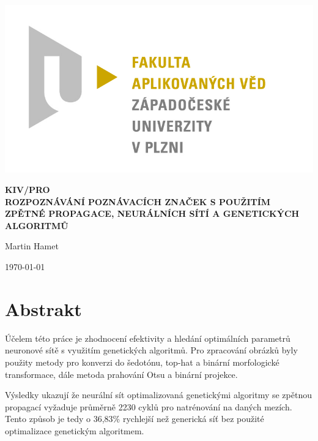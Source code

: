 \documentclass[12pt]{article}
\begin{document}
\begin{titlepage}
\includegraphics[scale=0.2, trim=5cm 0 0 30cm]{logo.jpg}
\begin{center}
\vspace{5cm}
{\Huge
\textbf{KIV/PRO}\\
\vspace{1cm}
}
{\Large
\textbf{ROZPOZNÁVÁNÍ POZNÁVACÍCH ZNAČEK S POUŽITÍM ZPĚTNÉ PROPAGACE, NEURÁLNÍCH SÍTÍ A GENETICKÝCH ALGORITMŮ}
}
\end{center}
\vspace{\fill}

\begin{minipage}[t]{5cm}
\flushleft
Martin Hamet\\
\end{minipage}
\hfill
\begin{minipage}[t]{7cm}
\flushright
\today
\end{minipage}
\end{titlepage}

\tableofcontents
\newpage
\section{Abstrakt}
Účelem této práce je zhodnocení efektivity a hledání optimálních parametrů neuronové sítě s využitím genetických algoritmů. Pro zpracování obrázků byly použity metody pro konverzi do šedotónu, top-hat a binární morfologické transformace, dále metoda prahování Otsu a binární projekce. 

Výsledky ukazují že neurální sít optimalizovaná genetickými algoritmy se zpětnou propagací vyžaduje průměrně 2230 cyklů pro natrénování na daných mezích. Tento způsob je tedy o 36,83\% rychlejší než generická síť bez použité optimalizace genetickým algoritmem.
\end{document}
